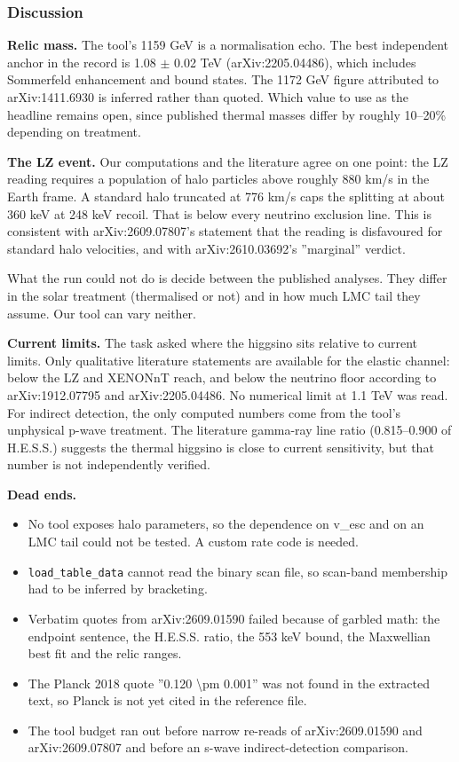 \documentclass[11pt,a4paper]{article}
\begin{document}
\subsubsection*{Discussion}
\textbf{Relic mass.} The tool's 1159 GeV is a normalisation echo. The best independent anchor in the record is 1.08 $\pm$ 0.02 TeV (arXiv:2205.04486), which includes Sommerfeld enhancement and bound states. The 1172 GeV figure attributed to arXiv:1411.6930 is inferred rather than quoted. Which value to use as the headline remains open, since published thermal masses differ by roughly 10--20\% depending on treatment.

\textbf{The LZ event.} Our computations and the literature agree on one point: the LZ reading requires a population of halo particles above roughly 880 km/s in the Earth frame. A standard halo truncated at 776 km/s caps the splitting at about 360 keV at 248 keV recoil. That is below every neutrino exclusion line. This is consistent with arXiv:2609.07807's statement that the reading is disfavoured for standard halo velocities, and with arXiv:2610.03692's ''marginal'' verdict.

What the run could not do is decide between the published analyses. They differ in the solar treatment (thermalised or not) and in how much LMC tail they assume. Our tool can vary neither.

\textbf{Current limits.} The task asked where the higgsino sits relative to current limits. Only qualitative literature statements are available for the elastic channel: below the LZ and XENONnT reach, and below the neutrino floor according to arXiv:1912.07795 and arXiv:2205.04486. No numerical limit at 1.1 TeV was read. For indirect detection, the only computed numbers come from the tool's unphysical p-wave treatment. The literature gamma-ray line ratio (0.815--0.900 of H.E.S.S.) suggests the thermal higgsino is close to current sensitivity, but that number is not independently verified.

\textbf{Dead ends.}

\begin{itemize}
  \item No tool exposes halo parameters, so the dependence on v\_esc and on an LMC tail could not be tested. A custom rate code is needed.
  \item \texttt{load\_\allowbreak{}table\_\allowbreak{}data} cannot read the binary scan file, so scan-band membership had to be inferred by bracketing.
  \item Verbatim quotes from arXiv:2609.01590 failed because of garbled math: the endpoint sentence, the H.E.S.S. ratio, the 553 keV bound, the Maxwellian best fit and the relic ranges.
  \item The Planck 2018 quote ''0.120 \textbackslash{}pm 0.001'' was not found in the extracted text, so Planck is not yet cited in the reference file.
  \item The tool budget ran out before narrow re-reads of arXiv:2609.01590 and arXiv:2609.07807 and before an s-wave indirect-detection comparison.
\end{itemize}
\end{document}
